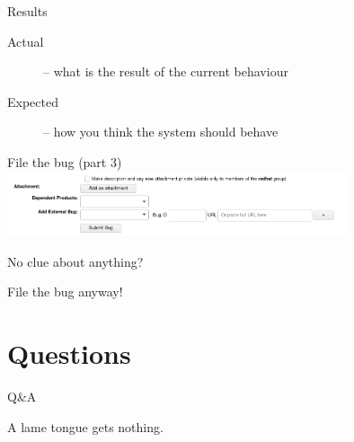 \documentclass[12pt]{beamer}
\begin{document}
\begin{frame}{Results}
\begin{description}
	\item[Actual] -- what is the result of the current behaviour
	\item[Expected] -- how you think the system should behave
\end{description}
\end{frame}

\begin{frame}{File the bug (part 3)}
\includegraphics[width=10cm]{images/bz_footer.png}
\end{frame}

\begin{frame}{No clue about anything?}

{\Large File the bug anyway!}
\end{frame}

\section{Questions}

\begin{frame}{Q\&A}

{\Large A lame tongue gets nothing.}
\end{frame}
\end{document}
